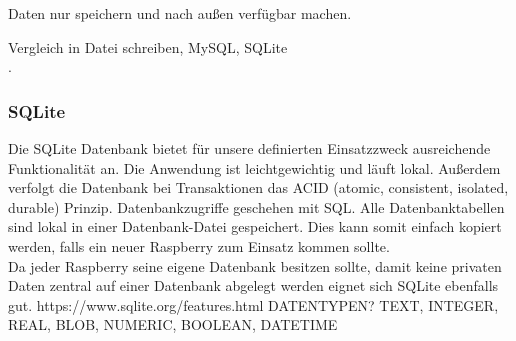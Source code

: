 Daten nur speichern und nach außen verfügbar machen.

Vergleich in Datei schreiben, MySQL, SQLite\\
.
\subsubsection{SQLite}
Die SQLite Datenbank bietet für unsere definierten Einsatzzweck ausreichende Funktionalität an. Die Anwendung ist leichtgewichtig und läuft lokal. Außerdem verfolgt die Datenbank bei Transaktionen das ACID (atomic, consistent, isolated, durable) Prinzip. Datenbankzugriffe geschehen mit SQL. Alle Datenbanktabellen sind lokal in einer Datenbank-Datei gespeichert. Dies kann somit einfach kopiert werden, falls ein neuer Raspberry zum Einsatz kommen sollte.\\
Da jeder Raspberry seine eigene Datenbank besitzen sollte, damit keine privaten Daten zentral auf einer Datenbank abgelegt werden eignet sich SQLite ebenfalls gut.   https://www.sqlite.org/features.html
DATENTYPEN? TEXT, INTEGER, REAL, BLOB, NUMERIC, BOOLEAN, DATETIME 


